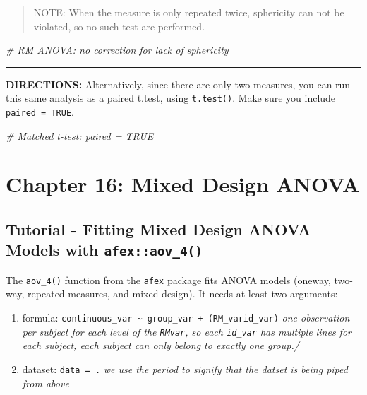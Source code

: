 \documentclass[]{article}
\newenvironment{Shaded}{\begin{snugshade}}{\end{snugshade}}
\newcommand{\CommentTok}[1]{\textcolor[rgb]{0.56,0.35,0.01}{\textit{#1}}}
\begin{document}
\begin{quote}
NOTE: When the measure is only repeated twice, sphericity can not be
violated, so no such test are performed.
\end{quote}

\begin{Shaded}
\begin{Highlighting}[]
\CommentTok{# RM ANOVA: no correction for lack of sphericity }
\end{Highlighting}
\end{Shaded}

\begin{center}\rule{0.5\linewidth}{\linethickness}\end{center}

\textbf{DIRECTIONS:} Alternatively, since there are only two measures,
you can run this same analysis as a paired t.test, using
\texttt{t.test()}. Make sure you include \texttt{paired\ =\ TRUE}.

\begin{Shaded}
\begin{Highlighting}[]
\CommentTok{# Matched t-test: paired = TRUE}
\end{Highlighting}
\end{Shaded}

\clearpage

\section{Chapter 16: Mixed Design
ANOVA}\label{chapter-16-mixed-design-anova}

\subsection{\texorpdfstring{Tutorial - Fitting Mixed Design ANOVA Models
with
\texttt{afex::aov\_4()}}{Tutorial - Fitting Mixed Design ANOVA Models with afex::aov\_4()}}\label{tutorial---fitting-mixed-design-anova-models-with-afexaov_4}

The \texttt{aov\_4()} function from the \texttt{afex} package fits ANOVA
models (oneway, two-way, repeated measures, and mixed design). It needs
at least two arguments:

\begin{enumerate}
\def\labelenumi{\arabic{enumi}.}
\item
  formula:
  \texttt{continuous\_var\ \textasciitilde{}\ group\_var\ +\ (RM\_var\textbar{}id\_var)}
  \emph{one observation per subject for each level of the
  \texttt{RMvar}, so each \texttt{id\_var} has multiple lines for each
  subject, each subject can only belong to exactly one group./}
\item
  dataset: \texttt{data\ =\ .} \emph{we use the period to signify that
  the datset is being piped from above}
\end{enumerate}
\end{document}
